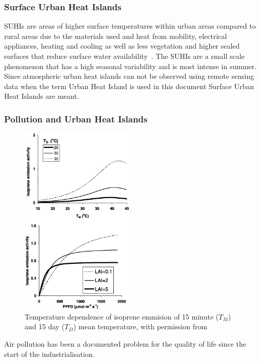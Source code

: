 \documentclass[12pt,a4paper, english,twoside]{article}
\begin{document}
    \subsubsection{Surface Urban Heat Islands}\label{sec:suhi}
       \glspl{SUHI} are areas of higher surface temperatures within urban areas compared to rural areas due to the materials used and heat from mobility, electrical appliances, heating and cooling as well as less vegetation and higher sealed surfaces that reduce surface water availability~\cite[pp. 7-12]{EPA2008}. 
       The \glspl{SUHI} are a small scale phenomenon that has a high seasonal variability and is most intense in summer.
       Since atmospheric urban heat islands can not be observed using remote sensing data when the term Urban Heat Island is used in this document Surface Urban Heat Islands are meant. 
    \newpage
    \subsubsection{Pollution and Urban Heat Islands}
      \begin{figure}
       \begin{center}
         \includegraphics[width=0.48\textwidth]{img/VOCsGraphs}
       \end{center}
       \caption{Temperature dependence of isoprene emmision of 15 minute ($T_M$) and 15 day ($T_D$) mean temperature, with permission from~\cite{Guenther2000}}\label{fig:tempVOC}
      \end{figure}
      Air pollution has been a documented problem for the quality of life since the start of the industrialisation. 
\end{document}
